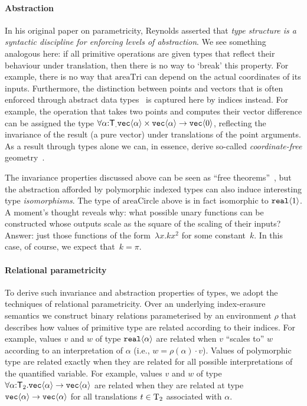 \paragraph{Abstraction}
In his original paper on parametricity, Reynolds asserted that
\emph{type structure is a syntactic discipline for enforcing levels of
  abstraction}.  We see something analogous here: if all primitive
operations are given types that reflect their behaviour under
translation, then there is no way to `break' this property. For
example, there is no way that $\mathrm{areaTri}$ can depend on the
actual coordinates of its inputs. Furthermore, the distinction between
points and vectors that is often enforced through abstract data
types~\cite{CGAL} is captured here by indices instead. For example,
the operation that takes two points and computes their vector
difference can be assigned the type
$\forall\alpha\mathord:\mathsf{T}_.\textup{\texttt{vec}}\langle \alpha \rangle\times\textup{\texttt{vec}}\langle \alpha \rangle\to\textup{\texttt{vec}}\langle 0 \rangle$,
reflecting the invariance of the result (a pure vector) under
translations of the point arguments. As a result through types alone
we can, in essence, derive so-called \emph{coordinate-free}
geometry~\cite{CFGADT}.

The invariance properties discussed above can be seen as ``free
theorems''~\cite{wadler89theorems}, but the abstraction afforded by
polymorphic indexed types can also induce interesting type
\emph{isomorphisms}.  The type of $\mathrm{areaCircle}$ above is in
fact isomorphic to $\textup{\texttt{real}}\langle 1 \rangle$. A moment's thought reveals why:
what possible unary functions can be constructed whose outputs scale
as the square of the scaling of their inputs?  Answer: just those
functions of the form~$\lambda x. k x^2$ for some constant~$k$.  In
this case, of course, we expect that~$k = \pi$.

\paragraph{Relational parametricity}
To derive such invariance and abstraction properties of types, we
adopt the techniques of relational parametricity. Over an underlying
index-erasure semantics we construct binary relations parameterised by
an environment $\rho$ that describes how values of primitive type are
related according to their indices.  For example, values $v$ and $w$
of type $\textup{\texttt{real}}\langle \alpha \rangle$ are related when $v$ ``scales to'' $w$
according to an interpretation of $\alpha$ (i.e., $w=\rho(\alpha)\cdot
v$).  Values of polymorphic type are related exactly when they are
related for all possible interpretations of the quantified
variable. For example, values $v$ and $w$ of type
$\forall\alpha\mathord:\mathsf{T}_2.\textup{\texttt{vec}}\langle \alpha \rangle\to
\textup{\texttt{vec}}\langle \alpha \rangle$ are related when they are related at type
$\textup{\texttt{vec}}\langle \alpha \rangle\to\textup{\texttt{vec}}\langle \alpha \rangle$ for all translations
$t\in\mathrm{T}_2$ associated with $\alpha$.

